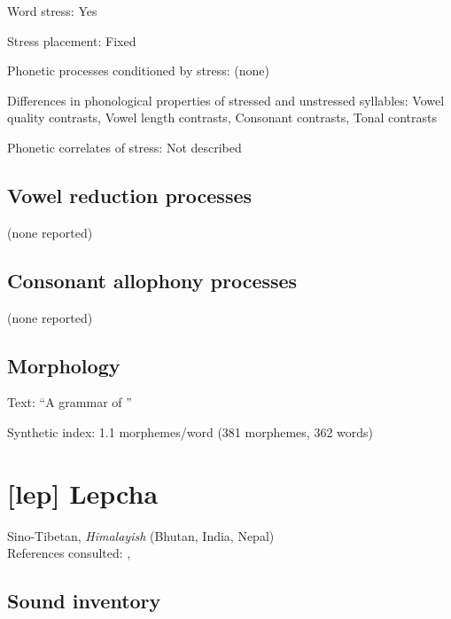 {\begin{appendixdesc}
\item[Word stress:] Yes

\item[Stress placement:] Fixed

\item[Phonetic processes conditioned by stress:] (none)

\item[Differences in phonological properties of stressed and unstressed syllables:] Vowel quality contrasts, Vowel length contrasts, Consonant contrasts, Tonal contrasts

\item[Phonetic correlates of stress:] Not described
\end{appendixdesc}
\subsection*{Vowel reduction processes}

(none reported)
\subsection*{Consonant allophony processes}

(none reported)
\subsection*{Morphology}

\begin{appendixdesc}

\item[Text:] “A grammar of ” \citep[488--497]{Enfield2007}

\item[Synthetic index:] 1.1 morphemes/word (381 morphemes, 362 words)
\end{appendixdesc}
\newpage\section*{[lep] Lepcha}   %
Sino-Tibetan, \textit{Himalayish} (Bhutan, India, Nepal)\medskip\\
References consulted: \citet{Plaisier2007}, \citet{Sprigg1966}
\subsection*{Sound inventory}
\begin{appendixdesc}


\end{appendixdesc}}
